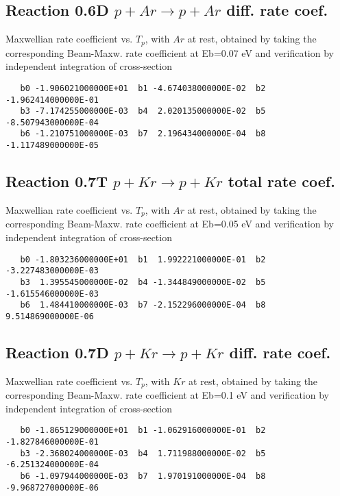 \documentclass[12pt,dvipdfmx]{article}
\begin{document}
\subsection{
Reaction 0.6D  $p + Ar \rightarrow p + Ar$ diff. rate coef.
}
Maxwellian rate coefficient vs. $T_{p}$, with $Ar$ at rest, obtained by taking
the corresponding Beam-Maxw. rate coefficient at Eb=0.07 eV and
verification by independent integration of cross-section
\begin{small}\begin{verbatim}
   b0 -1.906021000000E+01  b1 -4.674038000000E-02  b2 -1.962414000000E-01
   b3 -7.174255000000E-03  b4  2.020135000000E-02  b5 -8.507943000000E-04
   b6 -1.210751000000E-03  b7  2.196434000000E-04  b8 -1.117489000000E-05
\end{verbatim}\end{small}




\subsection{
Reaction 0.7T  $p + Kr \rightarrow p + Kr$ total rate coef.
}
Maxwellian rate coefficient vs. $T_{p}$, with $Ar$ at rest, obtained by taking
the corresponding Beam-Maxw. rate coefficient at Eb=0.05 eV and
verification by independent integration of cross-section
\begin{small}\begin{verbatim}
   b0 -1.803236000000E+01  b1  1.992221000000E-01  b2 -3.227483000000E-03
   b3  1.395545000000E-02  b4 -1.344849000000E-02  b5 -1.615546000000E-03
   b6  1.484410000000E-03  b7 -2.152296000000E-04  b8  9.514869000000E-06
\end{verbatim}\end{small}


\subsection{
Reaction 0.7D  $p + Kr \rightarrow p + Kr$ diff. rate coef.
}
Maxwellian rate coefficient vs. $T_{p}$, with $Kr$ at rest, obtained by taking
the corresponding Beam-Maxw. rate coefficient at Eb=0.1 eV and
verification by independent integration of cross-section
\begin{small}\begin{verbatim}
   b0 -1.865129000000E+01  b1 -1.062916000000E-01  b2 -1.827846000000E-01
   b3 -2.368024000000E-03  b4  1.711988000000E-02  b5 -6.251324000000E-04
   b6 -1.097944000000E-03  b7  1.970191000000E-04  b8 -9.968727000000E-06
\end{verbatim}\end{small}
\end{document}
